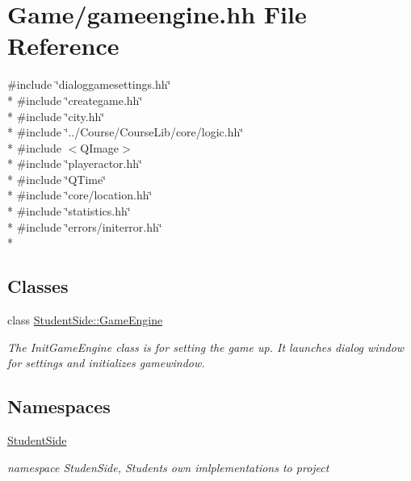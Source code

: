 \hypertarget{gameengine_8hh}{\section{Game/gameengine.hh File Reference}
\label{gameengine_8hh}
}
{\ttfamily \#include \char`\"{}dialoggamesettings.\-hh\char`\"{}}\\*
{\ttfamily \#include \char`\"{}creategame.\-hh\char`\"{}}\\*
{\ttfamily \#include \char`\"{}city.\-hh\char`\"{}}\\*
{\ttfamily \#include \char`\"{}../\-Course/\-Course\-Lib/core/logic.\-hh\char`\"{}}\\*
{\ttfamily \#include $<$Q\-Image$>$}\\*
{\ttfamily \#include \char`\"{}playeractor.\-hh\char`\"{}}\\*
{\ttfamily \#include \char`\"{}Q\-Time\char`\"{}}\\*
{\ttfamily \#include \char`\"{}core/location.\-hh\char`\"{}}\\*
{\ttfamily \#include \char`\"{}statistics.\-hh\char`\"{}}\\*
{\ttfamily \#include \char`\"{}errors/initerror.\-hh\char`\"{}}\\*
\subsection*{Classes}
\begin{DoxyCompactItemize}
\item 
class \hyperlink{class_student_side_1_1_game_engine}{Student\-Side\-::\-Game\-Engine}
\begin{DoxyCompactList}\small\item\em The Init\-Game\-Engine class is for setting the game up. It launches dialog window for settings and initializes gamewindow. \end{DoxyCompactList}\end{DoxyCompactItemize}
\subsection*{Namespaces}
\begin{DoxyCompactItemize}
\item 
\hyperlink{namespace_student_side}{Student\-Side}
\begin{DoxyCompactList}\small\item\em namespace Studen\-Side, Students own imlplementations to project \end{DoxyCompactList}\end{DoxyCompactItemize}
